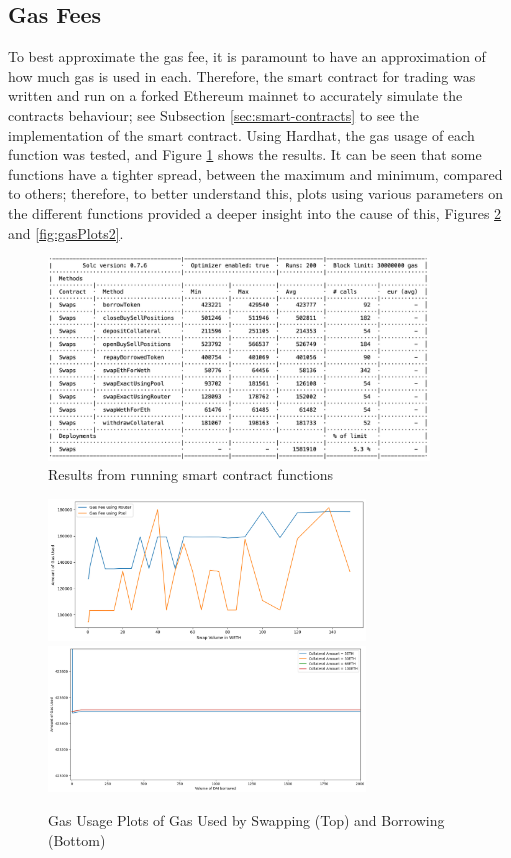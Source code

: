 \subsection{Gas Fees}
To best approximate the gas fee, it is paramount to have an approximation of how much gas is used in each. Therefore, the smart contract for trading was written and run on a forked Ethereum mainnet to accurately simulate the contracts behaviour; see Subsection \ref{sec:smart-contracts} to see the implementation of the smart contract. Using Hardhat, the gas usage of each function was tested, and Figure \ref{fig:gasResult} shows the results. It can be seen that some functions have a tighter spread, between the maximum and minimum, compared to others; therefore, to better understand this, plots using various parameters on the different functions provided a deeper insight into the cause of this, Figures \ref{fig:gasPlots1} and \ref{fig:gasPlots2}.
\begin{figure}[!htb]
    \centering
    \includegraphics[width=0.9\textwidth]{project/Images/gas_fee_results.png}
    \caption{Results from running smart contract functions \label{fig:gasResult}}
\end{figure}

\begin{figure}[htb!]
    \centering
    \includegraphics[width=0.75\textwidth]{project/Images/SwapFeesPlot.png}\\
    \includegraphics[width=0.75\textwidth]{project/Images/BorrowFees2.png}
    \caption{Gas Usage Plots of Gas Used by Swapping (Top) and Borrowing (Bottom) \label{fig:gasPlots1}}
\end{figure}

